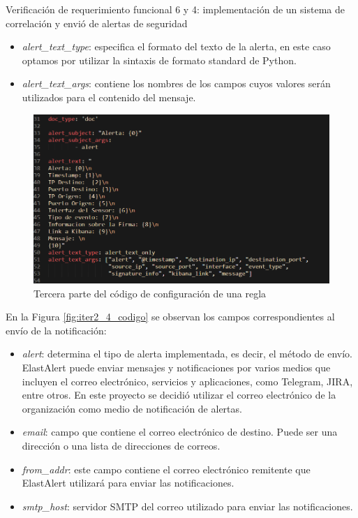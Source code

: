\begin{section}{Verificación de requerimiento funcional 6 y 4: implementación de un sistema de correlación y envió de alertas de seguridad}
\begin{itemize}
        \item \textit{alert\_text\_type}: especifica el formato del texto de la alerta, en este caso optamos por utilizar la sintaxis de formato standard de Python.
        \item \textit{alert\_text\_args}: contiene los nombres de los campos cuyos valores serán utilizados para el contenido del mensaje.
    \end{itemize}
    \begin{figure}[H]
    \centering
        \includegraphics[width=1\textwidth]{./iteracion_2_imagenes/5-codigoAlerta3.png}
        \caption{Tercera parte del código de configuración de una regla}
        \label{fig:iter2_3_codigo}
    \end{figure}
    \FloatBarrier
    En la Figura \ref{fig:iter2_4_codigo} se observan los campos correspondientes al envío de la notificación:
    \begin{itemize}
        \item \textit{alert}: determina el tipo de alerta implementada, es decir, el método de envío. ElastAlert puede enviar mensajes y notificaciones por varios medios que incluyen el correo electrónico, servicios y aplicaciones, como Telegram, JIRA, entre otros. En este proyecto se decidió utilizar el correo electrónico de la organización como medio de notificación de alertas.
        \item \textit{email}: campo que contiene el correo electrónico de destino. Puede ser una dirección o una lista de direcciones de correos.
        \item \textit{from\_addr}: este campo contiene el correo electrónico remitente que ElastAlert utilizará para enviar las notificaciones.
        \item \textit{smtp\_host}: servidor SMTP del correo utilizado para enviar las notificaciones.

\end{itemize}
\end{section}
